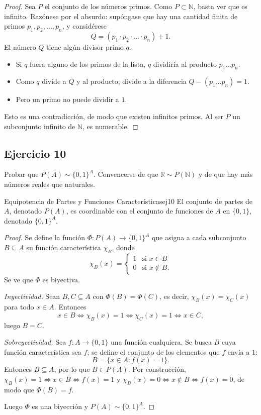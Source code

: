 \documentclass[11pt, a4paper]{article}
\begin{document}
\begin{proof}
Sea $P$ el conjunto de los números primos. Como $P \subset \mathbb{N}$, basta ver que es infinito.
Razónese por el absurdo: supóngase que hay una cantidad finita de primos $p_1, p_2, \dots, p_n$, y
considérese
$$ Q = (p_1 \cdot p_2 \cdot \dots \cdot p_n) + 1. $$
El número $Q$ tiene algún divisor primo $q$.
\begin{itemize}
    \item Si $q$ fuera alguno de los primos de la lista, $q$ dividiría al producto $p_1 \dots p_n$.
    \item Como $q$ divide a $Q$ y al producto, divide a la diferencia $Q - (p_1 \dots p_n) = 1$.
    \item Pero un primo no puede dividir a $1$.
\end{itemize}
Esto es una contradicción, de modo que existen infinitos primos. Al ser $P$ un subconjunto infinito de
$\mathbb{N}$, es numerable.
\end{proof}

\subsection*{Ejercicio 10}

Probar que $P(A) \sim \{0,1\}^{A}$. Convencerse de que $\mathbb{R} \sim P(\mathbb{N})$ y de que hay
más números reales que naturales.

\begin{proposicion}{Equipotencia de Partes y Funciones Características}{ej10}
El conjunto de partes de $A$, denotado $P(A)$, es coordinable con el conjunto de funciones de $A$ en
$\{0,1\}$, denotado $\{0,1\}^A$.
\end{proposicion}

\begin{proof}
Se define la función $\Phi: P(A) \to \{0,1\}^A$ que asigna a cada subconjunto $B \subseteq A$ su
función característica $\chi_B$, donde
$$ \chi_B(x) = \begin{cases} 1 & \text{si } x \in B \\ 0 & \text{si } x \notin B. \end{cases} $$
Se ve que $\Phi$ es biyectiva.

\textit{Inyectividad.} Sean $B, C \subseteq A$ con $\Phi(B) = \Phi(C)$, es decir,
$\chi_B(x) = \chi_C(x)$ para todo $x \in A$. Entonces
$$ x \in B \iff \chi_B(x) = 1 \iff \chi_C(x) = 1 \iff x \in C, $$
luego $B = C$.

\textit{Sobreyectividad.} Sea $f: A \to \{0,1\}$ una función cualquiera. Se busca $B$ cuya función
característica sea $f$; se define el conjunto de los elementos que $f$ envía a $1$:
$$ B = \{ x \in A : f(x) = 1 \}. $$
Entonces $B \subseteq A$, por lo que $B \in P(A)$. Por construcción,
$\chi_B(x) = 1 \iff x \in B \iff f(x) = 1$ y $\chi_B(x) = 0 \iff x \notin B \iff f(x) = 0$, de modo que
$\Phi(B) = f$.

Luego $\Phi$ es una biyección y $P(A) \sim \{0,1\}^A$.
\end{proof}
\end{document}

